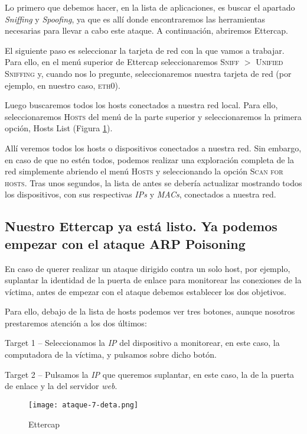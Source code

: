 Lo primero que debemos hacer, en la lista de aplicaciones, es buscar el apartado 
\emph{Sniffing} y \emph{Spoofing}, ya que es allí donde encontraremos las herramientas necesarias
 para llevar a cabo este ataque. A continuación, abriremos Ettercap.



El siguiente paso es seleccionar la tarjeta de red con la que vamos a trabajar. Para 
ello, en el menú superior de Ettercap seleccionaremos \textsc{Sniff} $>$ \textsc{Unified Sniffing} y, 
cuando nos lo pregunte, seleccionaremos nuestra tarjeta de red (por ejemplo, en 
nuestro caso, \textsc{eth0}).

Luego buscaremos todos los hosts conectados a nuestra red local. Para ello, 
seleccionaremos \textsc{Hosts} del menú de la parte superior y seleccionaremos la primera 
opción, Hosts List (Figura \ref{ettercap}).

Allí veremos todos los hosts o dispositivos conectados a nuestra red. 
Sin embargo, en caso de que no estén todos, podemos realizar una exploración 
completa de la red simplemente abriendo el menú \textsc{Hosts} y seleccionando la opción 
\textsc{Scan for hosts}. Tras unos segundos, la lista de antes se debería actualizar 
mostrando todos los dispositivos, con sus respectivas \emph{IPs} y \emph{MACs}, conectados 
a nuestra red.



\subsection{Nuestro Ettercap ya está listo. Ya podemos empezar con el ataque ARP Poisoning}

En caso de querer realizar un ataque dirigido contra un solo host, por ejemplo, 
suplantar la identidad de la puerta de enlace para monitorear las conexiones 
de la víctima, antes de empezar con el 
ataque debemos establecer los dos objetivos.

Para ello, debajo de la lista de hosts podemos ver tres botones, aunque nosotros 
prestaremos atención a los dos últimos:

    Target 1 – Seleccionamos la \emph{IP} del dispositivo a monitorear, en este caso, 
    la computadora de la víctima, y pulsamos sobre dicho botón.

    Target 2 – Pulsamos la \emph{IP} que queremos suplantar, en este caso, la de la 
    puerta de enlace y la del servidor \emph{web}.

    \begin{center}
        \begin{figure}   
           \begin{center}
              \texttt{[image: ataque-7-deta.png]}
           \end{center}
           \caption{Ettercap}
           \label{ettercap}
        \end{figure}
     \end{center}

